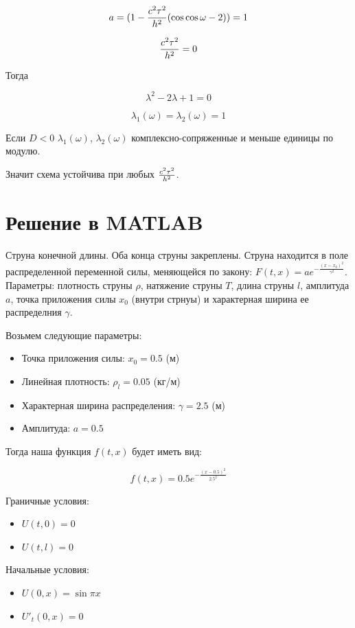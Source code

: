 \documentclass[a4paper]{article}
\begin{document}
$$a = (1-{c^2\tau^2 \over h^2}(\cos{\cos{\omega}}-2)) = 1$$

$${c^2\tau^2 \over h^2} = 0$$

Тогда

$$\lambda^2 - 2\lambda + 1 = 0$$

$$\lambda_1(\omega) = \lambda_2(\omega) = 1$$

Если $D<0$ $\lambda_1(\omega)$, $\lambda_2(\omega)$ комплексно-сопряженные и меньше единицы по модулю.

Значит схема устойчива при любых ${c^2\tau^2 \over h^2}$.

\newpage

\section{Решение в MATLAB}

Струна конечной длины. Оба конца струны закреплены. Струна находится в поле распределенной переменной силы, меняющейся по закону: $F(t, x) = ae^{-\frac{(x-x_0)^2}{\gamma^2}}$. \\
Параметры: плотность струны $\rho$, натяжение струны $T$, длина струны $l$, амплитуда $a$, точка приложения силы $x_0$ (внутри стрнуы) и характерная ширина ее распределния $\gamma$.

Возьмем следующие параметры:
\begin{itemize}
    \item Точка приложения силы: $ x_0 = 0.5 $ (м)
    \item Линейная плотность: $ \rho_l = 0.05 $ (кг/м)
    \item Характерная ширина распределения: $ \gamma = 2.5 $ (м)
    \item Амплитуда: $ a = 0.5 $
\end{itemize}

Тогда  наша функция $ f(t,x) $ будет иметь вид:

$$
    f(t,x) = 0.5 e^{-\frac{(x - 0.5)^2}{2.5^2}}
$$

Граничные условия:

\begin{itemize}
    \item $ U(t, 0) = 0 $
    \item $ U(t, l) = 0 $
\end{itemize}

Начальные условия:

\begin{itemize}
    \item $ U(0, x) = \sin{\pi x} $
    \item $ U'_t(0, x) = 0 $
\end{itemize}
\end{document}
